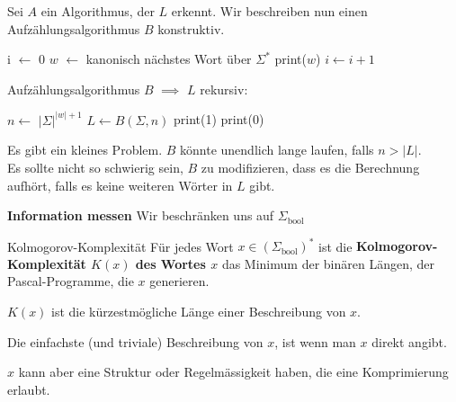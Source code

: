 \documentclass[a4paper, 11pt]{article}
\begin{document}
        Sei $A$ ein Algorithmus, der $L$ erkennt. Wir beschreiben nun einen Aufzählungsalgorithmus $B$ konstruktiv. 
    
        \begin{algorithm}[H]
            \caption{$B(\Sigma, n)$}
            \begin{algorithmic}
                \State i $\leftarrow$ 0
                    \State $w$ $\leftarrow$ kanonisch nächstes Wort über $\Sigma^*$
                    \State print($w$)
                    \State $i \leftarrow i + 1$
                    \EndIf 
                \EndWhile
            \end{algorithmic}
        \end{algorithm}
    
        Aufzählungsalgorithmus $B$ $\implies$ $L$ rekursiv:
    
        \begin{algorithm}[H]
            \caption{$A(\Sigma, w)$}
            \begin{algorithmic}
                \State$n \leftarrow$ $|\Sigma|^{|w| + 1}$
                \State $L \leftarrow B(\Sigma, n)$
                \State print(1)
                \Else
                \State print(0)
                \EndIf
            \end{algorithmic}
        \end{algorithm}
        Es gibt ein kleines Problem. $B$ könnte unendlich lange laufen, falls $n > |L|$.\\ 
        Es sollte nicht so schwierig sein, $B$ zu modifizieren, dass es die Berechnung aufhört, falls es keine weiteren Wörter in $L$ gibt.
    
    
    
        \textbf{Information messen}
        Wir beschränken uns auf $\Sigma_{\text{bool}}$
        \begin{mainbox}{Kolmogorov-Komplexität}
            Für jedes Wort $x \in (\Sigma_{\text{bool}})^*$ ist die \textbf{Kolmogorov-Komplexität $K(x)$ des Wortes $x$} das Minimum der binären Längen, der Pascal-Programme, die $x$ generieren.
        \end{mainbox}
        $K(x)$ ist die kürzestmögliche Länge einer Beschreibung von $x$.
    
        Die einfachste (und triviale) Beschreibung von $x$, ist wenn man $x$ direkt angibt.
    
        $x$ kann aber eine Struktur oder Regelmässigkeit haben, die eine Komprimierung erlaubt.
    
\end{document}
